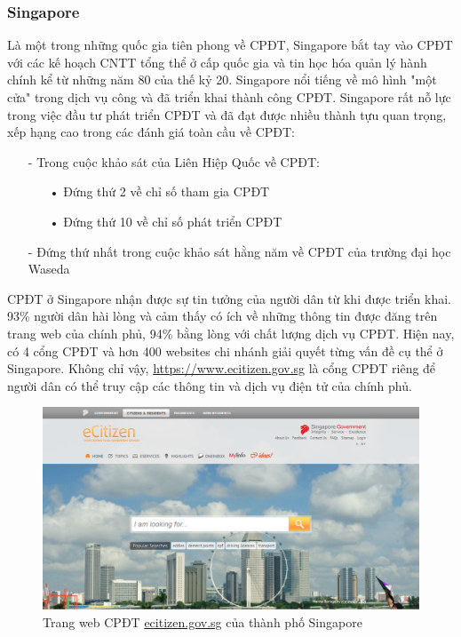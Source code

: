 \documentclass[a4paper]{article}
\begin{document}
\subsubsection{Singapore}
Là một trong những quốc gia tiên phong về CPĐT, Singapore bắt tay vào CPĐT với các kế hoạch CNTT tổng thể ở cấp quốc gia và tin học hóa quản lý hành chính kể từ những năm 80 của thế kỷ 20. Singapore nổi tiếng về mô hình "một cửa" trong dịch vụ công và đã triển khai thành công CPĐT. Singapore rất nỗ lực trong việc đầu tư phát triển CPĐT và đã đạt được nhiều thành tựu quan trọng, xếp hạng cao trong các đánh giá toàn cầu về CPĐT:
\begin{itemize}
	\item[-]Trong cuộc khảo sát của Liên Hiệp Quốc về CPĐT:
	\begin{itemize}
	\item[•]Đứng thứ 2 về chỉ số tham gia CPĐT
	\item[•]Đứng thứ 10 về chỉ số phát triển CPĐT
	\end{itemize}
	\item[-]Đứng thứ nhất trong cuộc khảo sát hằng năm về CPĐT của trường đại học Waseda
\end{itemize}
CPĐT ở Singapore nhận được sự tin tưởng của người dân từ khi được triển khai. 93\% người dân hài lòng và cảm thấy có ích về những thông tin được đăng trên trang web của chính phủ, 94\% bằng lòng với chất lượng dịch vụ CPĐT.
Hiện nay, có 4 cổng CPĐT và hơn 400 websites chi nhánh giải quyết từng vấn đề cụ thể ở Singapore. Không chỉ vậy, \url{https://www.ecitizen.gov.sg} là cổng CPĐT riêng để người dân có thể truy cập các thông tin và dịch vụ điện tử của chính phủ.	
\begin{center}
    \begin{figure}[h]
    \begin{center}
     \includegraphics[scale=.4]{singapore.PNG}
    \end{center}
    \caption{Trang web CPĐT \url{ecitizen.gov.sg} của thành phố Singapore}
    \label{refhinh2}
    \end{figure}
\end{center}
\end{document}
